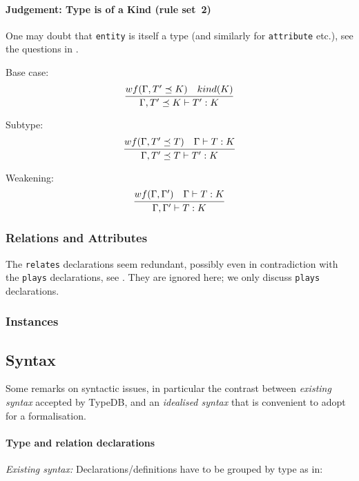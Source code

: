 \documentclass{article}
\begin{document}
\paragraph{Judgement: Type is of a Kind (rule set~2)}

One may doubt that \texttt{entity} is itself a type (and similarly for
\texttt{attribute} etc.), see the questions in
.

Base case:
$$
\infer{\Gamma, T' \preceq K \vdash T' : K}{
  wf(\Gamma, T' \preceq K)  & kind(K)
}
$$

Subtype:
$$
\infer{\Gamma, T' \preceq T \vdash T' : K}{
  wf(\Gamma, T' \preceq T) & \Gamma \vdash T : K 
}
$$

Weakening:
$$
\infer{\Gamma, \Gamma' \vdash T : K}{
  wf(\Gamma, \Gamma')
  & 
  \Gamma \vdash T : K
}
$$


\subsubsection{Relations and Attributes}\label{sec:structure_rels_attribs}

The \texttt{relates} declarations seem redundant, possibly even in
contradiction with the \texttt{plays} declarations, see
. They are ignored here; we only discuss
\texttt{plays} declarations.



\subsubsection{Instances}\label{sec:structure_instances}


\subsection{Syntax}

Some remarks on syntactic issues, in particular the contrast between
\emph{existing syntax} accepted by TypeDB, and an \emph{idealised syntax} that
is convenient to adopt for a formalisation.

\paragraph{Type and relation declarations}

\emph{Existing syntax:} Declarations/definitions have to be grouped by type as
in:
\end{document}
